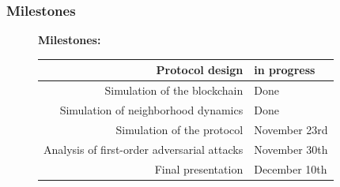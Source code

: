 \documentclass{beamer}
\begin{document}
\begin{frame}
	\frametitle{Milestones}
	\begin{figure}
		\textbf{Milestones:} \\
		\vspace{3mm}
		\begin{tabular}{|r|l|}
			\hline
			Protocol design & in progress \\
			\hline
			Simulation of the blockchain & Done \\
			\hline
			Simulation of neighborhood dynamics & Done \\
			\hline
			Simulation of the protocol & November 23rd \\ %
			\hline
			Analysis of first-order adversarial attacks & November 30th \\
			\hline
			Final presentation & December 10th \\
			\hline
		\end{tabular}
	\end{figure}
\end{frame}
\end{document}
